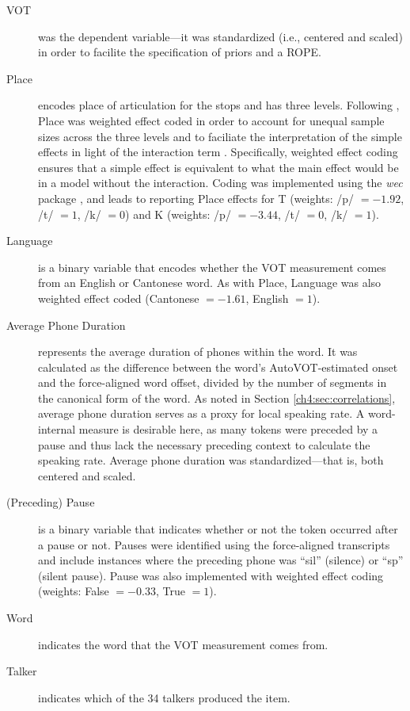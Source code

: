 \begin{description}
  \item[VOT] was the dependent variable---it was standardized (i.e., centered and scaled) in order to facilite the specification of priors and a ROPE. 
  \item[Place] encodes place of articulation for the stops and has three levels. Following \citet{chodroff_2017_structure}, Place was weighted effect coded in order to account for unequal sample sizes across the three levels and to faciliate the interpretation of the simple effects in light of the interaction term \citep{brehm_2021_contrasts}. Specifically, weighted effect coding ensures that a simple effect is equivalent to what the main effect would be in a model without the interaction. Coding was implemented using the \textit{wec} package \citep{nieuwenhuis_2017_weighted}, and leads to reporting Place effects for T (weights: /p/ $=-1.92$, /t/ $=1$, /k/ $=0$) and K (weights: /p/ $=-3.44$, /t/ $=0$, /k/ $=1$).  
  \item[Language] is a binary variable that encodes whether the VOT measurement comes from an English or Cantonese word. As with Place, Language was also weighted effect coded (Cantonese $=-1.61$, English $=1$).
  \item[Average Phone Duration] represents the average duration of phones within the word. It was calculated as the difference between the word's AutoVOT-estimated onset and the force-aligned word offset, divided by the number of segments in the canonical form of the word. As noted in Section \ref{ch4:sec:correlations}, average phone duration serves as a proxy for local speaking rate. A word-internal measure is desirable here, as many tokens were preceded by a pause and thus lack the necessary preceding context to calculate the speaking rate. Average phone duration was standardized---that is, both centered and scaled. 
  \item[(Preceding) Pause] is a binary variable that indicates whether or not the token occurred after a pause or not. Pauses were identified using the force-aligned transcripts and include instances where the preceding phone was ``sil'' (silence) or ``sp'' (silent pause). Pause was also implemented with weighted effect coding (weights: False $=-0.33$, True $=1$).
  \item[Word] indicates the word that the VOT measurement comes from. 
  \item[Talker] indicates which of the 34 talkers produced the item.
\end{description}

